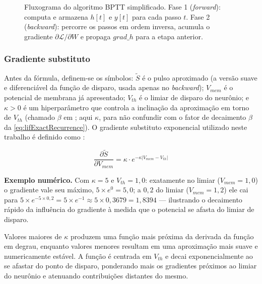 			

			\begin{figure}[H]
				\centering
				\caption[Fluxograma do algoritmo BPTT]{Fluxograma do algoritmo BPTT simplificado. Fase 1 (\textit{forward}): computa e armazena $h[t]$ e $y[t]$ para cada passo $t$. Fase 2 (\textit{backward}): percorre os passos em ordem inversa, acumula o gradiente $\partial\mathcal{L}/\partial W$ e propaga $\mathit{grad\_h}$ para a etapa anterior.}
				\resizebox{\linewidth}{!}{}
				\label{fig:bptt-fluxogram}
			\end{figure}

		\subsubsection{Gradiente substituto}

			\par Antes da fórmula, definem-se os símbolos: $\tilde{S}$ é o pulso aproximado (a versão suave e diferenciável da função de disparo, usada apenas no \textit{backward}); $V_{mem}$ é o potencial de membrana já apresentado; $V_{th}$ é o limiar de disparo do neurônio; e $\kappa>0$ é um hiperparâmetro que controla a inclinação da aproximação em torno de $V_{th}$ (chamado $\beta$ em ; aqui $\kappa$, para não confundir com o fator de decaimento $\beta$ da \autoref{eq:lifExactRecurrence}). O gradiente substituto exponencial utilizado neste trabalho é definido como \cite{10242251}:

			\begin{equation}
				\frac{\partial \tilde{S}}{\partial V_{mem}} = \kappa \cdot e^{-\kappa \left| V_{mem} - V_{th} \right|}
			\end{equation}
			\par \textbf{Exemplo numérico.} Com $\kappa=5$ e $V_{th}=1{,}0$: exatamente no limiar ($V_{mem}=1{,}0$) o gradiente vale seu máximo, $5\times e^{0} = 5{,}0$; a $0{,}2$ do limiar ($V_{mem}=1{,}2$) ele cai para $5\times e^{-5\times0{,}2} = 5\times e^{-1} \approx 5\times0{,}3679 = 1{,}8394$ --- ilustrando o decaimento rápido da influência do gradiente à medida que o potencial se afasta do limiar de disparo.

			\par Valores maiores de $\kappa$ produzem uma função mais próxima da derivada da função em degrau, enquanto valores menores resultam em uma aproximação mais suave e numericamente estável. A função é centrada em $V_{th}$ e decai exponencialmente ao se afastar do ponto de disparo, ponderando mais os gradientes próximos ao limiar do neurônio e atenuando contribuições distantes do mesmo.

